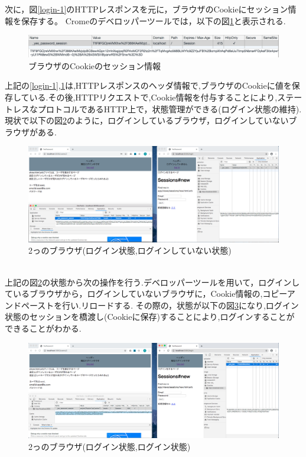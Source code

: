 \noindent 次に，図\ref{login-1}のHTTPレスポンスを元に，ブラウザのCookieにセッション情報を保存する。
Cromeのデベロッパーツールでは，以下の図\ref{login-2}と表示される.\\
\begin{figure}[h]
    \includegraphics[width=13cm]{fig/chapter3/login-2.png}
    \caption{ブラウザのCookieのセッション情報}
    \label{login-2}
\end{figure}
上記の\ref{login-1},\ref{login-2}は,HTTPレスポンスのヘッダ情報で,ブラウザのCookieに値を保存している.その後,HTTPリクエストで,Cookie情報を付与\cite{cookie1}することにより,ステートレスなプロトコルであるHTTP上で，状態管理ができる\cite{cookie2}(ログイン状態の維持).
\\
現状で以下の図\ref{login_compare-1}のように，ログインしているブラウザ，ログインしていないブラウザがある.\\
\begin{figure}[h]
    \includegraphics[width=13cm]{fig/chapter3/login_compare-1.png}
    \caption{2っのブラウザ(ログイン状態,ログインしていない状態)} 
    \label{login_compare-1}
\end{figure}
\\
上記の図\ref{login_compare-1}の状態から次の操作を行う.デベロッパーツールを用いて，ログインしているブラウザから，ログインしていないブラウザに，Cookie情報の,コピーアンドペーストを行い.リロードする.
その際の，状態が以下の図\ref{login_compare-2}になり,ログイン状態のセッションを橋渡し(Cookieに保存)することにより,ログインすることができることがわかる.\\
\begin{figure}[h]
    \includegraphics[width=13cm]{fig/chapter3/login_compare-2.png}
    \caption{2っのブラウザ(ログイン状態,ログイン状態)} 
    \label{login_compare-2}
\end{figure}
